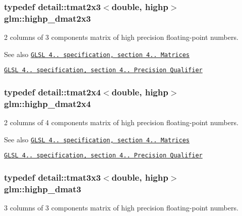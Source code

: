 \subsubsection[{\texorpdfstring{highp\+\_\+dmat2x3}{highp_dmat2x3}}]{\setlength{\rightskip}{0pt plus 5cm}typedef detail\+::tmat2x3$<$double, highp$>$ {\bf glm\+::highp\+\_\+dmat2x3}}\hypertarget{group__core__precision_gafec7367665f006f2a7643103c5eddc38}{}\label{group__core__precision_gafec7367665f006f2a7643103c5eddc38}
2 columns of 3 components matrix of high precision floating-\/point numbers.

\begin{DoxySeeAlso}{See also}
\href{http://www.opengl.org/registry/doc/GLSLangSpec.4.20.8.pdf}{\tt G\+L\+SL 4.. specification, section 4.. Matrices} 

\href{http://www.opengl.org/registry/doc/GLSLangSpec.4.20.8.pdf}{\tt G\+L\+SL 4.. specification, section 4.. Precision Qualifier} 
\end{DoxySeeAlso}
\subsubsection[{\texorpdfstring{highp\+\_\+dmat2x4}{highp_dmat2x4}}]{\setlength{\rightskip}{0pt plus 5cm}typedef detail\+::tmat2x4$<$double, highp$>$ {\bf glm\+::highp\+\_\+dmat2x4}}\hypertarget{group__core__precision_gacd51d8188f7d66a83c035b8c4cd69f2d}{}\label{group__core__precision_gacd51d8188f7d66a83c035b8c4cd69f2d}
2 columns of 4 components matrix of high precision floating-\/point numbers.

\begin{DoxySeeAlso}{See also}
\href{http://www.opengl.org/registry/doc/GLSLangSpec.4.20.8.pdf}{\tt G\+L\+SL 4.. specification, section 4.. Matrices} 

\href{http://www.opengl.org/registry/doc/GLSLangSpec.4.20.8.pdf}{\tt G\+L\+SL 4.. specification, section 4.. Precision Qualifier} 
\end{DoxySeeAlso}
\subsubsection[{\texorpdfstring{highp\+\_\+dmat3}{highp_dmat3}}]{\setlength{\rightskip}{0pt plus 5cm}typedef detail\+::tmat3x3$<$double, highp$>$ {\bf glm\+::highp\+\_\+dmat3}}\hypertarget{group__core__precision_ga993461e1d2caf19abd4f64d02ccdafa9}{}\label{group__core__precision_ga993461e1d2caf19abd4f64d02ccdafa9}
3 columns of 3 components matrix of high precision floating-\/point numbers.

